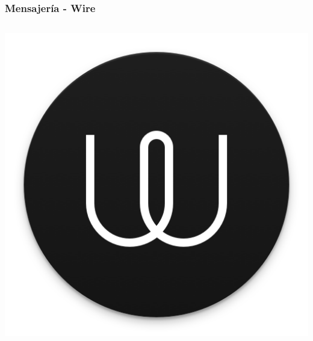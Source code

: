 \begin{frame}

    \frametitle{Mensajería - Wire}

    \begin{columns}[c]
            \begin{center}
                \includegraphics[height=0.15\textheight]{images/wire-logo.png}

\end{center}
\end{columns}
\end{frame}
